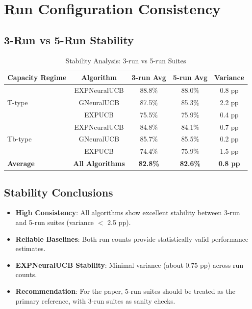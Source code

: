 \documentclass[11pt,a4paper]{article}
\newcommand{\performance}[1]{\textcolor{performancecolor}{\textbf{#1}}}
\newcommand{\critical}[1]{\textcolor{criticalcolor}{\textbf{#1}}}
\newcommand{\success}[1]{\textcolor{successcolor}{\textbf{#1}}}
\begin{document}
\section{Run Configuration Consistency}

\subsection{3-Run vs 5-Run Stability}

\begin{table}[H]
\centering
\caption{Stability Analysis: 3-run vs 5-run Suites}
\begin{tabular}{|l|c|c|c|c|}
\hline
\textbf{Capacity Regime} & \textbf{Algorithm} & \textbf{3-run Avg} & \textbf{5-run Avg} & \textbf{Variance} \\
\hline
\hline
\multirow{3}{*}{T-type}  & EXPNeuralUCB & 88.8\% & 88.0\% & 0.8 pp \\
                         & GNeuralUCB   & 87.5\% & 85.3\% & 2.2 pp \\
                         & EXPUCB       & 75.5\% & 75.9\% & 0.4 pp \\
\hline
\multirow{3}{*}{Tb-type} & EXPNeuralUCB & 84.8\% & 84.1\% & 0.7 pp \\
                         & GNeuralUCB   & 85.7\% & 85.5\% & 0.2 pp \\
                         & EXPUCB       & 74.4\% & 75.9\% & 1.5 pp \\
\hline
\textbf{Average} & \textbf{All Algorithms} & \textbf{82.8\%} & \textbf{82.6\%} & \textbf{0.8 pp} \\
\hline
\end{tabular}
\end{table}

\subsection{Stability Conclusions}

\begin{itemize}
\item \success{High Consistency}: All algorithms show excellent stability between 3-run and 5-run suites (variance $<$ 2.5 pp).
\item \success{Reliable Baselines}: Both run counts provide statistically valid performance estimates.
\item \performance{EXPNeuralUCB Stability}: Minimal variance (about 0.75 pp) across run counts.
\item \critical{Recommendation}: For the paper, 5-run suites should be treated as the primary reference, with 3-run suites as sanity checks.
\end{itemize}
\end{document}

